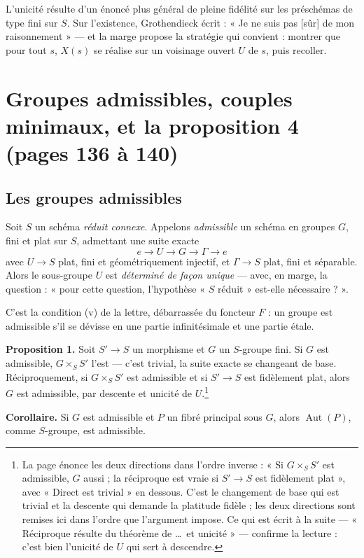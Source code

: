 \documentclass[11pt,a4paper]{article}
\begin{document}
L'unicité résulte d'un énoncé plus général de pleine fidélité sur les
préschémas de type fini sur $S$. Sur l'existence, Grothendieck écrit : « Je ne
suis pas [sûr] de mon raisonnement » --- et la marge propose la stratégie qui
convient : montrer que pour tout $s$, $X(s)$ se réalise sur un voisinage ouvert
$U$ de $s$, puis recoller.

\section*{Groupes admissibles, couples minimaux, et la proposition 4 (pages 136 à 140)}

\subsection*{Les groupes admissibles}

Soit $S$ un schéma \emph{réduit connexe}. Appelons \emph{admissible} un schéma
en groupes $G$, fini et plat sur $S$, admettant une suite exacte
\[
  e \longrightarrow U \longrightarrow G \longrightarrow \Gamma \longrightarrow
  e
\]
avec $U \to S$ plat, fini et géométriquement injectif, et $\Gamma \to S$ plat,
fini et séparable. Alors le sous-groupe $U$ est \emph{déterminé de façon
unique} --- avec, en marge, la question : « pour cette question, l'hypothèse
« $S$ réduit » est-elle nécessaire ? ».

C'est la condition (v) de la lettre, débarrassée du foncteur $F$ : un groupe
est admissible s'il se dévisse en une partie infinitésimale et une partie
étale.

\textbf{Proposition 1.} Soit $S' \to S$ un morphisme et $G$ un $S$-groupe fini.
Si $G$ est admissible, $G \times_{S} S'$ l'est --- c'est trivial, la suite
exacte se changeant de base. Réciproquement, si $G \times_{S} S'$ est admissible
et si $S' \to S$ est fidèlement plat, alors $G$ est admissible, par descente et
unicité de $U$.\footnote{La page énonce les deux directions dans l'ordre
inverse : « Si $G \times_{S} S'$ est admissible, $G$ aussi ; la réciproque est
vraie si $S' \to S$ est fidèlement plat », avec « Direct est trivial » en
dessous. C'est le changement de base qui est trivial et la descente qui demande
la platitude fidèle ; les deux directions sont remises ici dans l'ordre que
l'argument impose. Ce qui est écrit à la suite --- « Réciproque résulte du
théorème de \dots\ et unicité » --- confirme la lecture : c'est bien l'unicité
de $U$ qui sert à descendre.}

\textbf{Corollaire.} Si $G$ est admissible et $P$ un fibré principal sous $G$,
alors $\operatorname{Aut}(P)$, comme $S$-groupe, est admissible.
\end{document}
